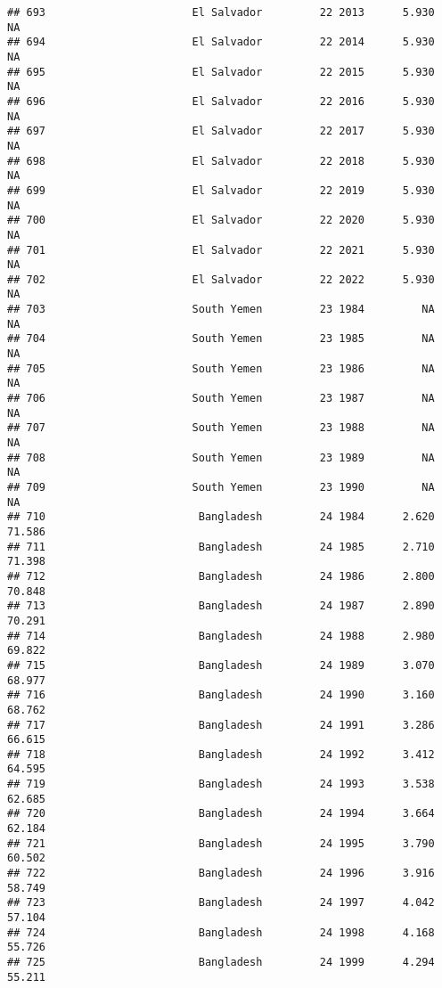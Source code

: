 \documentclass[
]{article}
\begin{document}
\begin{verbatim}
## 693                       El Salvador         22 2013      5.930         NA
## 694                       El Salvador         22 2014      5.930         NA
## 695                       El Salvador         22 2015      5.930         NA
## 696                       El Salvador         22 2016      5.930         NA
## 697                       El Salvador         22 2017      5.930         NA
## 698                       El Salvador         22 2018      5.930         NA
## 699                       El Salvador         22 2019      5.930         NA
## 700                       El Salvador         22 2020      5.930         NA
## 701                       El Salvador         22 2021      5.930         NA
## 702                       El Salvador         22 2022      5.930         NA
## 703                       South Yemen         23 1984         NA         NA
## 704                       South Yemen         23 1985         NA         NA
## 705                       South Yemen         23 1986         NA         NA
## 706                       South Yemen         23 1987         NA         NA
## 707                       South Yemen         23 1988         NA         NA
## 708                       South Yemen         23 1989         NA         NA
## 709                       South Yemen         23 1990         NA         NA
## 710                        Bangladesh         24 1984      2.620     71.586
## 711                        Bangladesh         24 1985      2.710     71.398
## 712                        Bangladesh         24 1986      2.800     70.848
## 713                        Bangladesh         24 1987      2.890     70.291
## 714                        Bangladesh         24 1988      2.980     69.822
## 715                        Bangladesh         24 1989      3.070     68.977
## 716                        Bangladesh         24 1990      3.160     68.762
## 717                        Bangladesh         24 1991      3.286     66.615
## 718                        Bangladesh         24 1992      3.412     64.595
## 719                        Bangladesh         24 1993      3.538     62.685
## 720                        Bangladesh         24 1994      3.664     62.184
## 721                        Bangladesh         24 1995      3.790     60.502
## 722                        Bangladesh         24 1996      3.916     58.749
## 723                        Bangladesh         24 1997      4.042     57.104
## 724                        Bangladesh         24 1998      4.168     55.726
## 725                        Bangladesh         24 1999      4.294     55.211

\end{verbatim}
\end{document}
